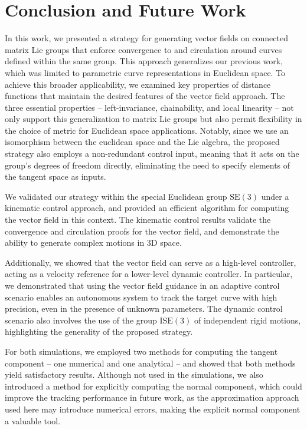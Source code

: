 \chapter{Conclusion and Future Work}\label{ch:conclusion}
In this work, we presented a strategy for generating vector fields on connected matrix Lie groups that enforce convergence to and circulation around curves defined within the same group. This approach generalizes our previous work, which was limited to parametric curve representations in Euclidean space. To achieve this broader applicability, we examined key properties of distance functions that maintain the desired features of the vector field approach. The three essential properties -- left-invariance, chainability, and local linearity -- not only support this generalization to matrix Lie groups but also permit flexibility in the choice of metric for Euclidean space applications. Notably, since we use an isomorphism between the euclidean space and the Lie algebra, the proposed strategy also employs a non-redundant control input, meaning that it acts on the group's degrees of freedom directly, eliminating the need to specify elements of the tangent space as inputs.

We validated our strategy within the special Euclidean group $\text{SE}(3)$ under a kinematic control approach, and provided an efficient algorithm for computing the vector field in this context. The kinematic control results validate the convergence and circulation proofs for the vector field, and demonstrate the ability to generate complex motions in 3D space.  

Additionally, we showed that the vector field can serve as a high-level controller, acting as a velocity reference for a lower-level dynamic controller. In particular, we demonstrated that using the vector field guidance in an adaptive control scenario enables an autonomous system to track the target curve with high precision, even in the presence of unknown parameters. The dynamic control scenario also involves the use of the group $\text{ISE}(3)$ of independent rigid motions, highlighting the generality of the proposed strategy.

For both simulations, we employed two methods for computing the tangent component -- one numerical and one analytical -- and showed that both methods yield satisfactory results. Although not used in the simulations, we also introduced a method for explicitly computing the normal component, which could improve the tracking performance in future work, as the approximation approach used here may introduce numerical errors, making the explicit normal component a valuable tool.

